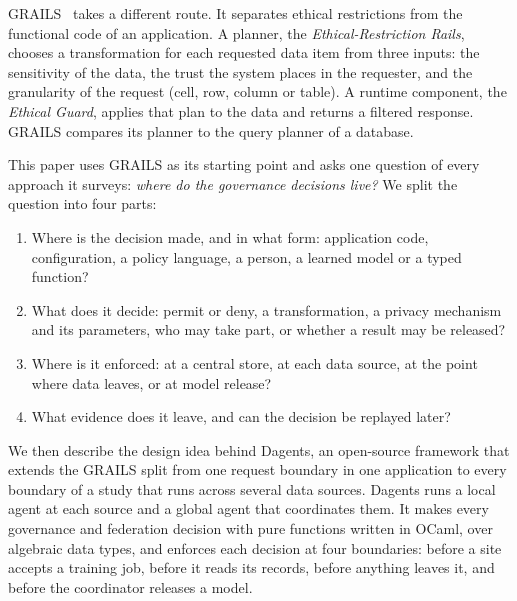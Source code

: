 GRAILS~\citep{kulkarni2025grails} takes a different route. It separates ethical
restrictions from the functional code of an application. A planner, the
\emph{Ethical-Restriction Rails}, chooses a transformation for each requested
data item from three inputs: the sensitivity of the data, the trust the system
places in the requester, and the granularity of the request (cell, row, column
or table). A runtime component, the \emph{Ethical Guard}, applies that plan to
the data and returns a filtered response. GRAILS compares its planner to the
query planner of a database.

This paper uses GRAILS as its starting point and asks one question of every
approach it surveys: \emph{where do the governance decisions live?} We split
the question into four parts:
\begin{enumerate}
  \item Where is the decision made, and in what form: application code,
        configuration, a policy language, a person, a learned model or a typed
        function?
  \item What does it decide: permit or deny, a transformation, a privacy
        mechanism and its parameters, who may take part, or whether a result
        may be released?
  \item Where is it enforced: at a central store, at each data source, at the
        point where data leaves, or at model release?
  \item What evidence does it leave, and can the decision be replayed later?
\end{enumerate}

We then describe the design idea behind Dagents, an open-source framework that
extends the GRAILS split from one request boundary in one application to every
boundary of a study that runs across several data sources. Dagents runs a local
agent at each source and a global agent that coordinates them. It makes every
governance and federation decision with pure functions written in OCaml, over
algebraic data types, and enforces each decision at four boundaries: before a
site accepts a training job, before it reads its records, before anything
leaves it, and before the coordinator releases a model.

